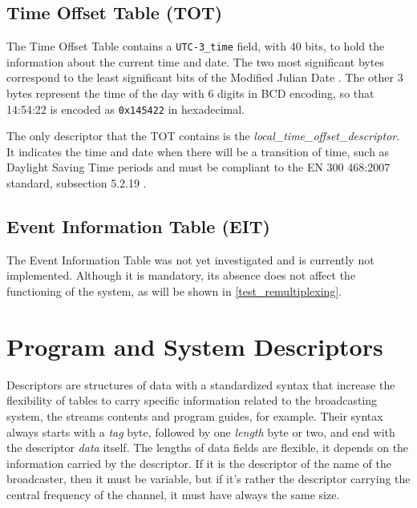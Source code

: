 \documentclass[
	12pt,				%
	openright,			%
	twoside,			%
	a4paper,			%
	brazil,
	french,				%
	english
	]{abntex2}
\begin{document}
\subsection{Time Offset Table (TOT)}
\label{TOT}
The Time Offset Table contains a \texttt{UTC-3\hspace{0.1mm}\_\hspace{0.1mm}time} field, with 40 bits, to hold the information about the current time and date. The two most significant bytes correspond to the least significant bits of the Modified Julian Date . The other 3 bytes represent the time of the day with 6 digits in BCD encoding, so that 14:54:22 is encoded as \texttt{0x145422} in hexadecimal.

The only descriptor that the TOT contains is the \textit{local\hspace{0.1mm}\_\hspace{0.1mm}time\hspace{0.1mm}\_\hspace{0.1mm}offset\hspace{0.1mm}\_\hspace{0.1mm}descriptor}. It indicates the time and date when there will be a transition of time, such as Daylight Saving Time periods and must be compliant to the EN 300 468:2007 standard, subsection 5.2.19 .

\subsection{Event Information Table (EIT)}
\label{EIT}
The Event Information Table was not yet investigated and is currently not implemented. Although it is mandatory, its absence does not affect the functioning of the system, as will be shown in \autoref{test_remultiplexing}.

\section{Program and System Descriptors}
\label{descriptors}
Descriptors are structures of data with a standardized syntax that increase the flexibility of tables to carry specific information related to the broadcasting system, the streams contents and program guides, for example. Their syntax always starts with a \textit{tag} byte, followed by one \textit{length} byte or two, and end with the descriptor \textit{data} itself. The lengths of data fields are flexible, it depends on the information carried by the descriptor. If it is the descriptor of the name of the broadcaster, then it must be variable, but if it's rather the descriptor carrying the central frequency of the channel, it must have always the same size.
\end{document}
